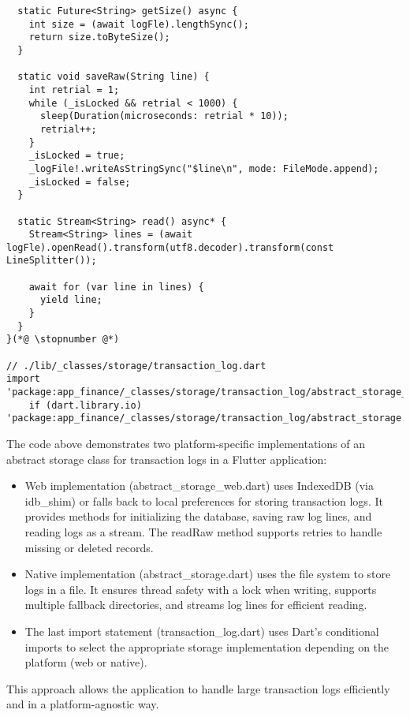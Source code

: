 \begin{lstlisting}
  static Future<String> getSize() async {
    int size = (await logFle).lengthSync();
    return size.toByteSize();
  }

  static void saveRaw(String line) {
    int retrial = 1;
    while (_isLocked && retrial < 1000) {
      sleep(Duration(microseconds: retrial * 10));
      retrial++;
    }
    _isLocked = true;
    _logFile!.writeAsStringSync("$line\n", mode: FileMode.append);
    _isLocked = false;
  }

  static Stream<String> read() async* {
    Stream<String> lines = (await logFle).openRead().transform(utf8.decoder).transform(const LineSplitter());

    await for (var line in lines) {
      yield line;
    }
  }
}(*@ \stopnumber @*)

// ./lib/_classes/storage/transaction_log.dart
import 'package:app_finance/_classes/storage/transaction_log/abstract_storage_web.dart'
    if (dart.library.io) 'package:app_finance/_classes/storage/transaction_log/abstract_storage.dart';
\end{lstlisting}

\noindent The code above demonstrates two platform-specific implementations of an abstract storage class for transaction 
logs in a Flutter application:

\begin{itemize}
\setlength{\itemsep}{3pt}
\setlength{\parskip}{0pt}
\setlength{\parsep}{0pt}
    \item Web implementation (abstract\_storage_web.dart) uses IndexedDB (via idb\_shim) or falls back to local 
    preferences for storing transaction logs. It provides methods for initializing the database, saving raw log lines, 
    and reading logs as a stream. The readRaw method supports retries to handle missing or deleted records.

    \item Native implementation (abstract\_storage.dart) uses the file system to store logs in a file. It ensures thread 
    safety with a lock when writing, supports multiple fallback directories, and streams log lines for efficient reading.

    \item The last import statement (transaction\_log.dart) uses Dart's conditional imports to select the appropriate 
    storage implementation depending on the platform (web or native).
\end{itemize}

\noindent This approach allows the application to handle large transaction logs efficiently and in a platform-agnostic 
way.



